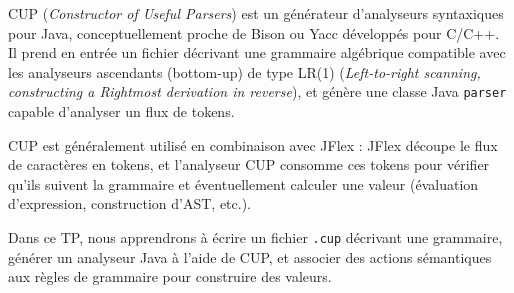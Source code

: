 \documentclass{td}
\begin{document}



CUP (\emph{Constructor of Useful Parsers}) est un générateur d'analyseurs
syntaxiques pour Java, conceptuellement proche de Bison ou Yacc développés pour C/C++.
Il prend en entrée un fichier décrivant une grammaire algébrique
compatible avec les analyseurs ascendants (bottom-up) de type LR(1)
(\emph{Left-to-right scanning, constructing a Rightmost derivation in reverse}),
et génère une classe Java \texttt{parser} capable d'analyser un flux de tokens.

CUP est généralement utilisé en combinaison avec JFlex : JFlex découpe
le flux de caractères en tokens, et l'analyseur CUP consomme ces tokens
pour vérifier qu'ils suivent la grammaire et éventuellement calculer
une valeur (évaluation d'expression, construction d'AST, etc.).

Dans ce TP, nous apprendrons à écrire un fichier \texttt{.cup} décrivant une grammaire,
générer un analyseur Java à l'aide de CUP,
et associer des actions sémantiques aux règles de grammaire pour construire des valeurs.
\end{document}
